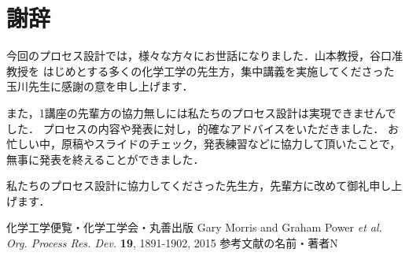 \documentclass[a4j]{jsreport}
\begin{document}
\newpage
\chapter*{謝辞}
今回のプロセス設計では，様々な方々にお世話になりました．山本教授，谷口准教授を
はじめとする多くの化学工学の先生方，集中講義を実施してくださった玉川先生に感謝の意を申し上げます．
\par
また，1講座の先輩方の協力無しには私たちのプロセス設計は実現できませんでした．
プロセスの内容や発表に対し，的確なアドバイスをいただきました．
お忙しい中，原稿やスライドのチェック，発表練習などに協力して頂いたことで，無事に発表を終えることができました．
\par
私たちのプロセス設計に協力してくださった先生方，先輩方に改めて御礼申し上げます．

\newpage
\newpage

\begin{thebibliography}{10}
     化学工学便覧・化学工学会・丸善出版
     Gary Morris and  Graham Power \textit{et al.  Org. Process Res. Dev.} \textbf{19}, 1891-1902, 2015
     参考文献の名前・著者N
\end{thebibliography}

\newpage
\end{document}
